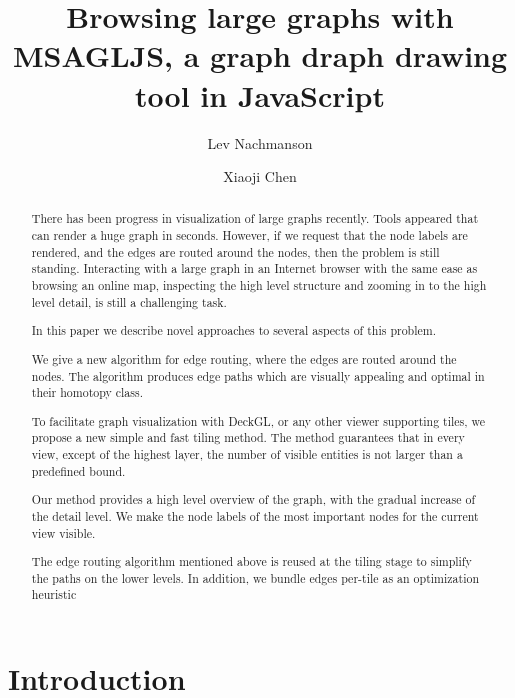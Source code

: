 \documentclass{gd-llncs}
\begin{document}
\title{Browsing large graphs with MSAGLJS, a graph draph drawing tool in JavaScript }
\author{%
  Lev Nachmanson  \and
  Xiaoji Chen
}%
\maketitle

\begin{abstract}
  There has been progress in visualization of large graphs recently. Tools appeared that can render a huge graph in seconds. However, if we request that the node labels are rendered, and the edges are routed around the nodes, then the problem is still standing. Interacting with a large graph in an Internet browser with the same ease as browsing an online map, inspecting the high level structure and zooming in to the high level detail, is still a challenging task.
   
  In this paper we describe novel approaches to several aspects of this problem.

  We give a new algorithm for edge routing, where the edges are routed around the nodes. The algorithm produces edge paths which are visually appealing and optimal in their homotopy class.

  To facilitate graph visualization with DeckGL, or any other viewer supporting tiles, we propose a new simple and fast tiling method. The method guarantees that in every view, except of the highest layer, the number of visible entities is not larger than a predefined bound.

  Our method provides a high level overview of the graph, with the gradual increase of the detail level. We make the node labels of the most important nodes for the current view visible.

  The edge routing algorithm mentioned above is reused at the tiling stage to simplify the paths on the lower levels. In addition, we bundle edges per-tile as an optimization heuristic
\end{abstract}


\section*{Introduction}

\label{sec:intro}
\end{document}
